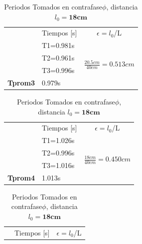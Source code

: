 \documentclass{article}
\begin{document}
\begin{table}[H]
\begin{subtable}{.5\linewidth}
        \begin{tabular}{@{}l|l|l|@{}}
\cmidrule(l){2-3}
\multicolumn{1}{c|}{} & \multicolumn{1}{c|}{Tiempos [s]} & \multicolumn{1}{c|}{$\epsilon=l_{0}$/L}     \\ \cmidrule(l){2-3} 
                      & T1=0.981s                        & \multirow{4}{*}{$\frac{20.5cm}{40cm}=0.513cm$} \\ \cmidrule(lr){2-2}
                      & T2=0.961s                        &                                \\ \cmidrule(lr){2-2}
                      & T3=0.996s                        &                                \\ \cmidrule(lr){2-2}
\textbf{Tprom3}   & 0.979s                            &                                \\ \cmidrule(l){2-3} 
\end{tabular}
\caption{Periodos Tomados en contrafase$\phi$, distancia $l_{0}=\textbf{20.5cm}$}
\label{contrafase1-3}
    \end{subtable}%
    \begin{subtable}{.8\linewidth}
      \centering
        \begin{tabular}{@{}l|l|l|@{}}
		\cmidrule(l){2-3}
\multicolumn{1}{c|}{} & \multicolumn{1}{c|}{Tiempos [s]} & \multicolumn{1}{c|}{$\epsilon=l_{0}$/L}       \\ \cmidrule(l){2-3} 
                      & T1=1.026s                        & \multirow{4}{*}{$\frac{18cm}{40cm}=0.450cm$}  \\ \cmidrule(lr){2-2}
                      & T2=0.996s                        &                                                 \\ \cmidrule(lr){2-2}
                      & T3=1.016s                        &                                  				 \\ \cmidrule(lr){2-2}
	\textbf{Tprom4}   & 1.013s                           &               				                      \\ \cmidrule(l){2-3} 
\end{tabular}
\caption{Periodos Tomados en contrafase$\phi$, distancia $l_{0}=\textbf{18cm}$}
\label{contrafase1-4}
    \end{subtable} 
    \begin{subtable}{.5\linewidth}
      \centering
        \begin{tabular}{@{}l|l|l|@{}}
\cmidrule(l){2-3}
\multicolumn{1}{c|}{} & \multicolumn{1}{c|}{Tiempos [s]} & \multicolumn{1}{c|}{$\epsilon=l_{0}$/L}     \\ \cmidrule(l){2-3} 

\end{tabular}
\end{subtable}
\end{table}
\end{document}
